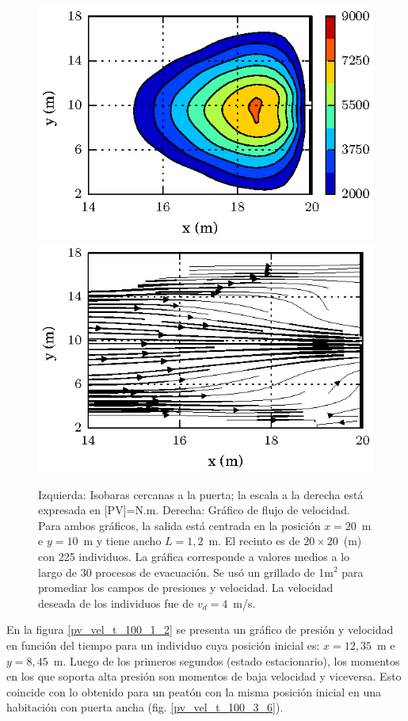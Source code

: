 \begin{figure}[H]
    \centering
    \includegraphics[scale=1.17]{figuras/fig4_version0.eps}
    \hfill
        \includegraphics[scale=1.17]{figuras/flujo_door_1_2m.eps}
    \caption[width=5cm]{Izquierda: Isobaras cercanas a la puerta; la escala a la derecha está expresada en [PV]=N.m. Derecha: Gráfico de flujo de velocidad. Para ambos gráficos, la salida está centrada en la posición $x=20$~m e $y=10$~m y tiene ancho $L=1,2$~m. El recinto es de $20\times 20$~(m) con 225 individuos. La gráfica corresponde a valores medios a lo largo de 30 procesos de evacuación. Se usó un grillado de 1m$^2$ para promediar los campos de presiones y velocidad. La velocidad deseada de los individuos fue de $v_d=4$~m/s.}
    \label{isobaras_flujo_1_2m}
\end{figure}

En la figura \ref{pv_vel_t_100_1_2} se presenta un gráfico de presión y velocidad en función del tiempo para un individuo cuya posición inicial es: $x=12,35$~m e $y=8,45$~m. Luego de los primeros segundos (estado estacionario), los momentos en los que soporta alta presión son momentos de baja velocidad y viceversa. Esto coincide con lo obtenido para un peatón con la misma posición inicial en una habitación con puerta ancha (fig. \ref{pv_vel_t_100_3_6}).\\

